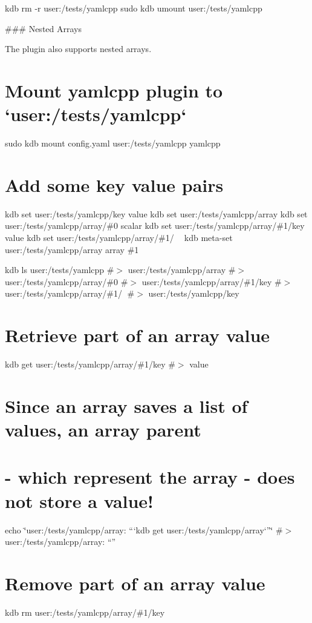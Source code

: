 kdb rm -\/r user\+:/tests/yamlcpp sudo kdb umount user\+:/tests/yamlcpp 
\begin{DoxyCode}
### Nested Arrays

The plugin also supports nested arrays.
\end{DoxyCode}
 \hypertarget{autotoc_md817_autotoc_md846}{}\section{Mount yamlcpp plugin to `user\+:/tests/yamlcpp`}\label{autotoc_md817_autotoc_md846}
sudo kdb mount config.\+yaml user\+:/tests/yamlcpp yamlcpp\hypertarget{autotoc_md817_autotoc_md847}{}\section{Add some key value pairs}\label{autotoc_md817_autotoc_md847}
kdb set user\+:/tests/yamlcpp/key value kdb set user\+:/tests/yamlcpp/array kdb set user\+:/tests/yamlcpp/array/\#0 scalar kdb set user\+:/tests/yamlcpp/array/\#1/key value kdb set user\+:/tests/yamlcpp/array/\#1/🔑 🙈 kdb meta-\/set user\+:/tests/yamlcpp/array array \textquotesingle{}\#1\textquotesingle{}

kdb ls user\+:/tests/yamlcpp \#$>$ user\+:/tests/yamlcpp/array \#$>$ user\+:/tests/yamlcpp/array/\#0 \#$>$ user\+:/tests/yamlcpp/array/\#1/key \#$>$ user\+:/tests/yamlcpp/array/\#1/🔑 \#$>$ user\+:/tests/yamlcpp/key\hypertarget{autotoc_md817_autotoc_md848}{}\section{Retrieve part of an array value}\label{autotoc_md817_autotoc_md848}
kdb get user\+:/tests/yamlcpp/array/\#1/key \#$>$ value\hypertarget{autotoc_md817_autotoc_md849}{}\section{Since an array saves a list of values, an array parent}\label{autotoc_md817_autotoc_md849}
\hypertarget{autotoc_md817_autotoc_md850}{}\section{-\/ which represent the array -\/ does not store a value!}\label{autotoc_md817_autotoc_md850}
echo \char`\"{}user\+:/tests/yamlcpp/array\+: “`kdb get user\+:/tests/yamlcpp/array`”\char`\"{} \#$>$ user\+:/tests/yamlcpp/array\+: “”\hypertarget{autotoc_md817_autotoc_md851}{}\section{Remove part of an array value}\label{autotoc_md817_autotoc_md851}
kdb rm user\+:/tests/yamlcpp/array/\#1/key

